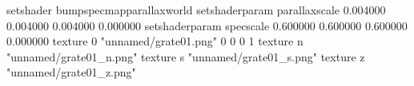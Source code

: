 setshader bumpspecmapparallaxworld
setshaderparam parallaxscale 0.004000 0.004000 0.004000 0.000000
setshaderparam specscale 0.600000 0.600000 0.600000 0.000000
texture 0 "unnamed/grate01.png" 0 0 0 1
texture n "unnamed/grate01_n.png"
texture s "unnamed/grate01_s.png"
texture z "unnamed/grate01_z.png"